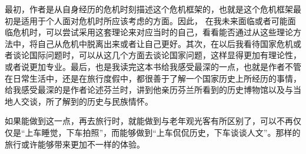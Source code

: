 \documentclass{article}
\begin{document}
    最初，作者是从自身经历的危机时刻描述这个危机框架的，也就是这个危机框架最初是适用于个人面对危机时所应该考虑的方面。因此， 在我未来面临或者可能面临危机时，可以尝试采用这套理论来对应当时的自己，看看能否通过从这些理论方法中，将自己从危机中脱离出来或者让自己更好。其次，在以后我看待国家危机或者谈论国际问题时，可以从这几个方面去谈论国家问题，这样显得更加有理论性，或者说更加专业。最后，也是我读完这本书给我感受最深的一点，也就是作者不管在日常生活中，还是在旅行度假中，都很善于了解一个国家历史上所经历的事情，给我感受最深的是作者论述芬兰时，讲到他亲历芬兰所看到的历史博物馆以及与当地人交谈，所了解到的历史与民族情怀。

    如果能做到这一点，再去旅行时，就能做到与老年观光客有所区别了，可以不再仅仅是“上车睡觉，下车拍照”，而能够做到“上车侃侃历史，下车谈谈人文”。那样的旅行或许能够带来更加不一样的体验。
\end{document}
